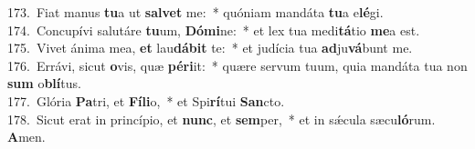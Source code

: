 {173.~}Fiat manus \textbf{tu}a ut \textbf{sal}\textbf{vet} me:~* quóniam mandáta \textbf{tu}a e\textbf{lé}gi.\\
{174.~}Concupívi salutáre \textbf{tu}um, \textbf{Dó}\textbf{mi}ne:~* et lex tua medi\textbf{tá}tio \textbf{me}a est.\\
{175.~}Vivet ánima mea, \textbf{et} lau\textbf{dá}\textbf{bit} te:~* et judícia tua \textbf{ad}ju\textbf{vá}bunt me.\\
{176.~}Errávi, sicut \textbf{o}vis, quæ \textbf{pé}\textbf{ri}it:~* quære servum tuum, quia mandáta tua non \textbf{sum} o\textbf{blí}tus.\\
{177.~}Glória \textbf{Pa}tri, et \textbf{Fí}\textbf{li}o,~* et Spi\textbf{rí}tui \textbf{San}cto.\\
{178.~}Sicut erat in princípio, et \textbf{nunc}, et \textbf{sem}per,~* et in sǽcula sæcu\textbf{ló}rum. \textbf{A}men.\\
